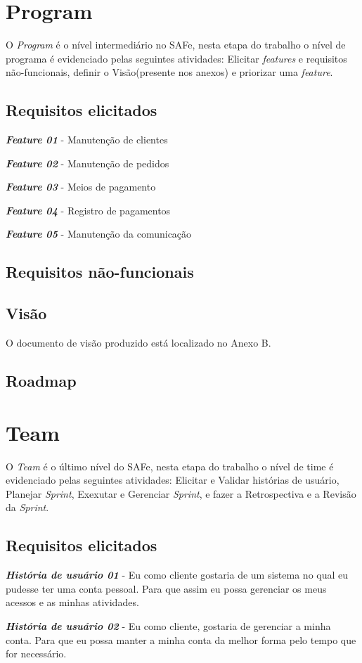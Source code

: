 \section{Program}
O \textit{Program} é o nível intermediário no SAFe, nesta etapa do trabalho o nível de programa é evidenciado pelas seguintes atividades: Elicitar \textit{features} e requisitos não-funcionais, definir o Visão(presente nos anexos) e priorizar uma \textit{feature}.
\subsection{Requisitos elicitados}
\textbf{\textit{Feature 01}} - Manutenção de clientes

\textbf{\textit{Feature 02}} - Manutenção de pedidos

\textbf{\textit{Feature 03}} - Meios de pagamento

\textbf{\textit{Feature 04}} - Registro de pagamentos

\textbf{\textit{Feature 05}} - Manutenção da comunicação
\subsection{Requisitos não-funcionais}
\subsection{Visão}
O documento de visão produzido está localizado no Anexo B.
\subsection{Roadmap}
\section{Team}
O \textit{Team} é o último nível do SAFe, nesta etapa do trabalho o nível de time é evidenciado pelas seguintes atividades: Elicitar e Validar histórias de usuário, Planejar \textit{Sprint}, Exexutar e Gerenciar \textit{Sprint}, e fazer a Retrospectiva e a Revisão da \textit{Sprint}.
\subsection{Requisitos elicitados}
\textbf{\textit{História de usuário 01}} - Eu como cliente gostaria de um sistema no qual eu pudesse ter uma conta pessoal. Para que assim eu possa gerenciar os meus acessos e as minhas atividades.

\textbf{\textit{História de usuário 02}} - Eu como cliente, gostaria de gerenciar a minha conta. Para que eu possa manter a minha conta da melhor forma pelo tempo que for necessário.

